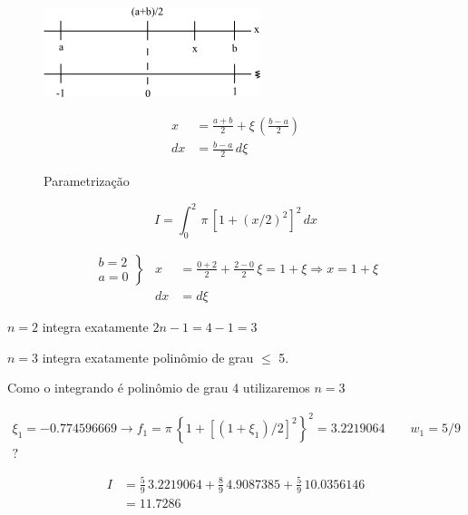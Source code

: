 \begin{enumerate}
\begin{figure}[htb]
 \centering
 \begin{minipage}[c]{7cm}
    \includegraphics[scale=0.8]{capitulos/capitulo2/figuras/quadraturas_de_gauss1.png}
    \caption{Parametrização}
    \label{fig:quadraturas_de_gauss1}
 \end{minipage}\hspace*{1cm}
 \begin{minipage}[c]{6cm}
     \[
      \begin{array}{ll}
       x & = \displaystyle \frac{a+b}{2} + \xi \, \left(\frac{b-a}{2}\right) \\
       dx & = \displaystyle \frac{b-a}{2} \, d\xi
      \end{array}
     \]
 \end{minipage}
\end{figure}

\begin{example}
\[
 I = \int_0^2 \, \pi \, [1 + (x/2)^2]^2 \, dx
\]

\[
 \begin{array}{lll}
 \left.
 \begin{array}{l}
  b = 2 \\
  a = 0
 \end{array}
 \right\}
 & x & = \displaystyle \frac{0+2}{2} + \displaystyle \frac{2-0}{2} \, \xi = 1 + \xi \Rightarrow x = 1 + \xi \\
 & dx & = d\xi
 \end{array}
\]

$n=2$ integra exatamente $2n-1 = 4-1 = 3$

$n=3$ integra exatamente polinômio de grau $\leq$ 5.

Como o integrando é polinômio de grau 4 utilizaremos $n=3$

\[
\begin{array}{l}
 \xi_1 = - 0.774596669 \rightarrow f_1 = \pi \, \left\{ 1 + \left[ (1+\xi_1)/2 \right]^2 \right\}^2 = 3.2219064 \qquad w_1=5/9 \\
 ?
\end{array}
\]

\[
\begin{array}{ll}
 I & = \displaystyle \frac{5}{9} \, 3.2219064 + \frac{8}{9} \, 4.9087385 + \frac{5}{9} \, 10.0356146 \\
   & = 11.7286
\end{array}
\]


\end{example}
\end{enumerate}
